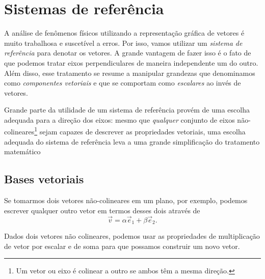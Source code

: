 \section{Sistemas de referência} 

A análise de fenômenos físicos utilizando a representação gráfica de vetores é muito trabalhosa e suscetível a erros. Por isso, vamos utilizar um \emph{sistema de referência} para denotar os vetores. A grande vantagem de fazer isso é o fato de que podemos tratar eixos perpendiculares de maneira independente um do outro. Além disso, esse tratamento se resume a manipular grandezas que denominamos como \emph{componentes vetoriais} e que se comportam como \emph{escalares} ao invés de vetores.

Grande parte da utilidade de um sistema de referência provém de uma escolha adequada para a direção dos eixos: mesmo que \emph{qualquer} conjunto de eixos não-colineares\footnote{Um vetor ou eixo é colinear a outro se ambos têm a mesma direção.} sejam capazes de descrever as propriedades vetoriais, uma escolha adequada do sistema de referência leva a uma grande simplificação do tratamento matemático

\subsection{Bases vetoriais}

Se tomarmos dois vetores não-colineares em um plano, por exemplo, podemos escrever qualquer outro vetor em termos desses dois através de
\begin{equation}
  \vec{v} = \alpha \vec{e}_1 + \beta \vec{e}_2.
\end{equation}

\begin{marginfigure}
\centering
{}
\caption{Dados dois vetores não colineares, podemos usar as propriedades de multiplicação de vetor por escalar e de soma para que possamos construir um novo vetor.\label{Fig:VetorObtidoAPartirDeUmaBase}}
\end{marginfigure}

